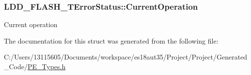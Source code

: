 \subsubsection[{Current\+Operation}]{ L\+D\+D\+\_\+\+F\+L\+A\+S\+H\+\_\+\+T\+Error\+Status\+::\+Current\+Operation}\label{struct_l_d_d___f_l_a_s_h___t_error_status_aa1b99bfba14fdc8379522df15da47e7b}
Current operation 

The documentation for this struct was generated from the following file\+:\begin{DoxyCompactItemize}
\item 
C\+:/\+Users/13115605/\+Documents/workspace/es18aut35/\+Project/\+Project/\+Generated\+\_\+\+Code/\hyperlink{_p_e___types_8h}{P\+E\+\_\+\+Types.\+h}\end{DoxyCompactItemize}
